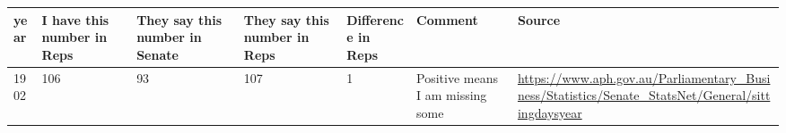 \documentclass[12pt,]{article}
\theoremstyle{definition}
\theoremstyle{definition}
\theoremstyle{definition}
\theoremstyle{remark}
\begin{document}
\begin{longtable}[]{@{}lllllll@{}}
\toprule
\begin{minipage}[b]{0.02\columnwidth}\raggedright\strut
year\strut
\end{minipage} & \begin{minipage}[b]{0.09\columnwidth}\raggedright\strut
I have this number in Reps\strut
\end{minipage} & \begin{minipage}[b]{0.10\columnwidth}\raggedright\strut
They say this number in Senate\strut
\end{minipage} & \begin{minipage}[b]{0.10\columnwidth}\raggedright\strut
They say this number in Reps\strut
\end{minipage} & \begin{minipage}[b]{0.07\columnwidth}\raggedright\strut
Difference in Reps\strut
\end{minipage} & \begin{minipage}[b]{0.11\columnwidth}\raggedright\strut
Comment\strut
\end{minipage} & \begin{minipage}[b]{0.31\columnwidth}\raggedright\strut
Source\strut
\end{minipage}\tabularnewline
\midrule
\endhead
\begin{minipage}[t]{0.02\columnwidth}\raggedright\strut
1902\strut
\end{minipage} & \begin{minipage}[t]{0.09\columnwidth}\raggedright\strut
106\strut
\end{minipage} & \begin{minipage}[t]{0.10\columnwidth}\raggedright\strut
93\strut
\end{minipage} & \begin{minipage}[t]{0.10\columnwidth}\raggedright\strut
107\strut
\end{minipage} & \begin{minipage}[t]{0.07\columnwidth}\raggedright\strut
1\strut
\end{minipage} & \begin{minipage}[t]{0.11\columnwidth}\raggedright\strut
Positive means I am missing some\strut
\end{minipage} & \begin{minipage}[t]{0.31\columnwidth}\raggedright\strut
\url{https://www.aph.gov.au/Parliamentary_Business/Statistics/Senate_StatsNet/General/sittingdaysyear}\strut
\end{minipage}\tabularnewline

\end{longtable}
\end{document}
